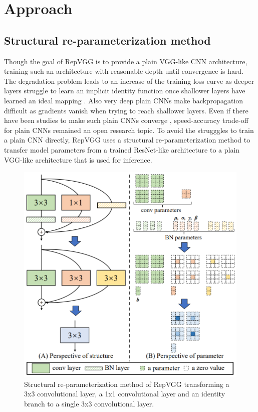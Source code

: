 \section{Approach} \label{approach}

\subsection{Structural re-parameterization method}

Though the goal of RepVGG is to provide a plain VGG-like CNN architecture, training such an architecture with reasonable depth until convergence is hard. The degradation problem leads to an increase of the training loss curve as deeper layers struggle to learn an implicit identity function once shallower layers have learned an ideal mapping \cite{KaimingHe.2015}. Also very deep plain CNNs make backpropagation difficult as gradients vanish when trying to reach shallower layers. Even if there have been studies to make such plain CNNs converge \cite{LechaoXiao.2018, OyebadeKOyedotun.2020}, speed-accuracy trade-off for plain CNNs remained an open research topic. To avoid the strugggles to train a plain CNN directly, RepVGG uses a structural re-parameterization method to transfer model parameters from a trained ResNet-like architecture to a plain VGG-like architecture that is used for inference. 

\begin{figure}[t]
	\begin{center}
		\includegraphics[width=0.8\linewidth]{images/re-parameterization.PNG}
	\end{center}
	\caption{Structural re-parameterization method of RepVGG transforming a 3x3 convolutional layer, a 1x1 convolutional layer and an identity branch to a single 3x3 convolutional layer.}
	\label{fig:reparameterization}
\end{figure}

